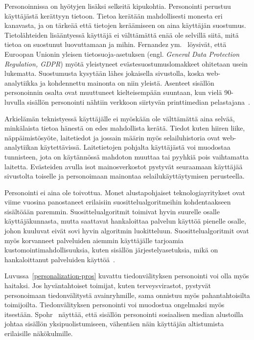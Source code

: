 \documentclass[finnish, 12pt, a4paper, elec, utf8, a-1b, online]{aaltothesis}
\begin{document}
Personoinnissa on hyötyjen lisäksi selkeitä kipukohtia. Personointi perustuu
käyttäjästä kerättyyn tietoon. Tietoa kerätään mahdollisesti monesta eri
kanavasta, ja on tärkeää että tietojen keräämiseen on aina käyttäjän suostumus.
Tietolähteiden lisääntyessä käyttäjä ei välttämättä enää ole selvillä siitä,
mitä tietoa on suostunut luovuttamaan ja mihin. Fernandez
ym.~\cite{10.1145/3476087} löysivät, että Euroopan Unionin yleisen
tietosuoja-asetuksen (engl. \textit{General Data Protection Regulation, GDPR})
myötä yleistyneet evästesuostumuslomakkeet ohitetaan usein lukematta.
Suostumusta kysytään lähes jokaisella sivustolla, koska web-analytiikka ja
kohdennettu mainonta on niin yleistä. Asenteet sisällön personoinnin osalta ovat
muuttuneet kielteisempään suuntaan, kun vielä 90-luvulla sisällön personointi
nähtiin verkkoon siirtyvän printtimedian pelastajana~\cite{adams_1995}.

Arkielämän teknistyessä käyttäjälle ei myöskään ole välttämättä aina selvää,
minkälaista tietoa hänestä on edes mahdollista kerätä. Tiedot kuten hiiren
liike, näppäimistösyöte, laitetiedot ja jossain määrin myös selailuhistoria ovat
web-analytiikan käytettävissä. Laitetietojen pohjalta käyttäjästä voi muodostaa
tunnisteen, jota on käytännössä mahdoton muuttaa tai pyyhkiä pois vaihtamatta
laitetta. Evästeiden avulla isot mainosverkostot pystyvät seuraamaan käyttäjää
sivustolta toiselle ja personoimaan mainontaa selailukäyttäytymisen perusteella.

Personointi ei aina ole toivottua. Monet alustapohjaiset teknologiayritykset
ovat viime vuosina panostaneet erilaisiin suosittelualgoritmeihin kohdentaakseen
sisältöään paremmin. Suosittelualgoritmit toimivat hyvin suurelle osalle
käyttäjäkunnasta, mutta saattavat hankaloittaa palvelun käyttöä pienelle osalle,
johon kuuluvat eivät sovi hyvin algoritmin luokitteluun. Suosittelualgoritmit
ovat myös korvanneet palveluiden aiemmin käyttäjälle tarjoamia
kustomointimahdollisuuksia, kuten sisällön järjestelyasetuksia, mikä on
hankaloittanut palveluiden käyttöä~\cite{patel_2022}.

Luvussa~\ref{personalization-pros} kuvattu tiedonvälityksen personointi voi olla
myös haitaksi. Jos hyväntahtoiset toimijat, kuten terveysvirastot, pystyvät
personoimaan tiedonvälitystä avainryhmille, sama onnistuu myös pahantahtoisilta
toimijoilta. Tiedonvälityksen personointi voi muodostua ongelmaksi myös
itsestään. Spohr~\cite{doi:10.1177/0266382117722446} näyttää, että sisällön
personointi sosiaalisen median alustoilla johtaa sisällön yksipuolistumiseen,
vähentäen näin käyttäjän altistumista erilaisille näkökulmille.
\end{document}
